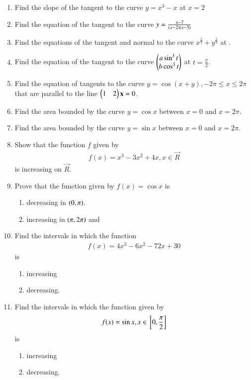 \begin{enumerate}[label=\arabic*.,ref=\thesubsection.\theenumi]
\item Find the slope of the tangent to the curve $y = x^3 - x$ at $x = 2$
%
\item Find the equation of the tangent to the curve 
$
y = \frac{x-7}{\left(x-2\right)\left(x-3\right)}
$
%
\item Find the equations of the tangent and normal to the curve 
$
x^{\frac{2}{3}}+y^{\frac{2}{3}} 
$
at .
\item Find the equation of the tangent to the curve 
$
\begin{pmatrix}a \sin^3 t\\b\cos^3t\end{pmatrix}
$
at $t = \frac{\pi}{2}$.
\item Find the equation of tangents to the curve $y = \cos (x + y), - 2\pi \le x \le 2\pi$
that are parallel to the line $\begin{pmatrix}1 & 2\end{pmatrix}\mathbf{x}= 0$.
%
\item Find the area bounded by the curve $y = \cos x $ between $x = 0$ and $x = 2\pi$.
\item Find the area bounded by the curve $y = \sin x$ between $x = 0$ and $x =2\pi$.
\item Show that the function $f$ given by 
\begin{align}
f(x) = x^3 - 3x^2 + 4x , x \in \vec{R}
\end{align}
%
is increasing on $\vec{R}$.
\item Prove that the function given by $f(x) = \cos x$ is
\begin{enumerate}
\item decreasing in $\left(0,\pi\right)$.
\item increasing in $\left(\pi,2\pi\right)$ and 
\end{enumerate}
%
\item Find the intervals in which the function 
\begin{align}
f(x)  = 4x^3-6x^2-72x+30
\end{align}
%
is 
\begin{enumerate}
\item increasing
\item decreasing.
\end{enumerate}
%
\item Find the intervals in which the function given by 
\begin{align}
f(x)  = \sin x, x \in {}\left[0,\frac{\pi}{2}\right]
\end{align}
%
is 
\begin{enumerate}
\item increasing
\item decreasing.
\end{enumerate}

\end{enumerate}
